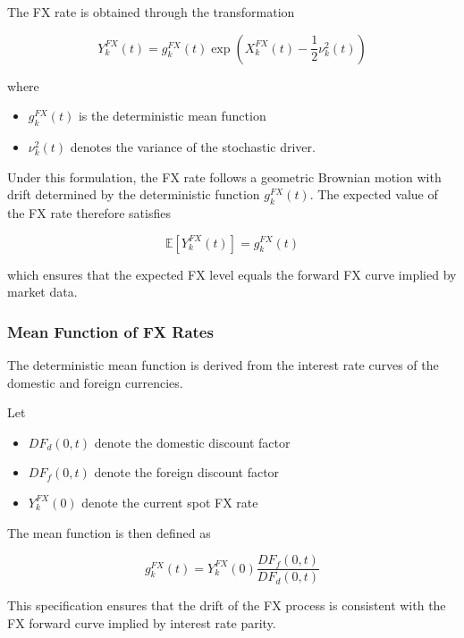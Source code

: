 The FX rate is obtained through the transformation

\begin{equation}
	Y_k^{FX}(t) = g_k^{FX}(t)\exp\left(X_k^{FX}(t) - \frac{1}{2}\nu_k^2(t)\right)
\end{equation}

where

\begin{itemize}
	\item $g_k^{FX}(t)$ is the deterministic mean function
	\item $\nu_k^2(t)$ denotes the variance of the stochastic driver.
\end{itemize}

Under this formulation, the FX rate follows a geometric Brownian motion with drift determined by the deterministic function $g_k^{FX}(t)$. The expected value of the FX rate therefore satisfies

\begin{equation}
	\mathbb{E}[Y_k^{FX}(t)] = g_k^{FX}(t)
\end{equation}

which ensures that the expected FX level equals the forward FX curve implied by market data.

\subsubsection{Mean Function of FX Rates}

The deterministic mean function is derived from the interest rate curves of the domestic and foreign currencies.

Let

\begin{itemize}
	\item $DF_d(0,t)$ denote the domestic discount factor
	\item $DF_f(0,t)$ denote the foreign discount factor
	\item $Y_k^{FX}(0)$ denote the current spot FX rate
\end{itemize}

The mean function is then defined as

\begin{equation}
	g_k^{FX}(t) = Y_k^{FX}(0)\frac{DF_f(0,t)}{DF_d(0,t)}
\end{equation}

This specification ensures that the drift of the FX process is consistent with the FX forward curve implied by interest rate parity.

